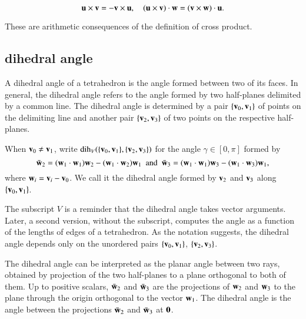 \begin{lemma}[]
\[ 
{\mathbf u}\times {\mathbf v} = -{\mathbf v}\times {\mathbf u},\quad
({\mathbf u}\times {\mathbf v})\cdot {\mathbf w} = ({\mathbf v}\times {\mathbf w})\cdot {\mathbf u}.
\] 
\end{lemma}

\begin{proved}
These are arithmetic consequences of the definition of cross product.
\swallowed\end{proved}



\subsection{dihedral angle}

A dihedral angle of a tetrahedron is the angle formed between two of
its faces. In general, the dihedral angle refers to the angle formed
by two half-planes delimited by a common line.  The dihedral angle is
determined by a pair $\{{\mathbf v}_0,{\mathbf v}_1\}$ of points on the delimiting line
and another pair $\{{\mathbf v}_2,{\mathbf v}_3\}$ of two points on the respective
half-planes.  %
%
%
%
%

\begin{definition}\label{def:dih}
 When ${\mathbf v}_0\ne {\mathbf v}_1$,
  write $\operatorname{dih}_V(\{{\mathbf v}_0,{\mathbf v}_1\},\{{\mathbf v}_2,{\mathbf v}_3\})$ for the angle
  $\gamma\in[0,\pi]$ formed by
\[ 
\bar {{\mathbf w}}_2 = ({\mathbf w}_1\cdot {\mathbf w}_1) {\mathbf w}_2 - ({\mathbf w}_1\cdot {\mathbf w}_2) {\mathbf w}_1\text{ \ and \ }  \bar {{\mathbf w}}_3 =
({\mathbf w}_1\cdot {\mathbf w}_1) {\mathbf w}_3 - ({\mathbf w}_1\cdot {\mathbf w}_3) {\mathbf w}_1,
\] 
where ${\mathbf w}_i={\mathbf v}_i-{\mathbf v}_0$.  We call it
the dihedral angle formed by ${\mathbf v}_2$ and ${\mathbf v}_3$ along $\{{\mathbf v}_0,{\mathbf v}_1\}$.
%
%
\end{definition}
The subscript $V$ is a reminder 
that the dihedral angle takes vector arguments.
Later, a second version, without the subscript, 
computes the angle as a function of the lengths of edges of a 
tetrahedron.
%
%
As the notation suggests, the dihedral angle depends only
on the unordered pairs $\{{\mathbf v}_0,{\mathbf v}_1\}$, $\{{\mathbf v}_2,{\mathbf v}_3\}$.

The dihedral angle can be interpreted as the planar angle between two rays, obtained by
projection of the two half-planes to a plane orthogonal to both of
them.  Up to positive scalars, $\bar {{\mathbf w}}_2$ and $\bar {{\mathbf w}}_3$ are the
projections of ${\mathbf w}_2$ and ${\mathbf w}_3$ to the plane through the origin
orthogonal to the vector ${\mathbf w}_1$.  The dihedral angle is the angle
between the projections $\bar {{\mathbf w}}_2$ and $\bar {{\mathbf w}}_3$ at ${\mathbf 0}$.

